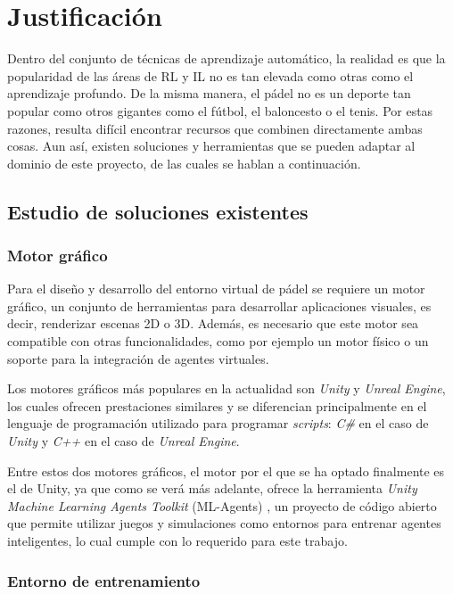 \chapter{Justificación}\label{chapter:justificacion}

Dentro del conjunto de técnicas de aprendizaje automático, la realidad es que la popularidad de las áreas de RL y IL no es tan elevada como otras como el aprendizaje profundo. De la misma manera, el pádel no es un deporte tan popular como otros gigantes como el fútbol, el baloncesto o el tenis. Por estas razones, resulta difícil encontrar recursos que combinen directamente ambas cosas. Aun así, existen soluciones y herramientas que se pueden adaptar al dominio de este proyecto, de las cuales se hablan a continuación.

\section{Estudio de soluciones existentes}

\subsection{Motor gráfico}

Para el diseño y desarrollo del entorno virtual de pádel se requiere un motor gráfico, un conjunto de herramientas para desarrollar aplicaciones visuales, es decir, renderizar escenas 2D o 3D. Además, es necesario que este motor sea compatible con otras funcionalidades, como por ejemplo un motor físico o un soporte para la integración de agentes virtuales.

Los motores gráficos más populares en la actualidad son \emph{Unity} y \emph{Unreal Engine}, los cuales ofrecen prestaciones similares y se diferencian principalmente en el lenguaje de programación utilizado para programar \emph{scripts}: \emph{C\#} en el caso de \emph{Unity} y \emph{C++} en el caso de \emph{Unreal Engine}.

Entre estos dos motores gráficos, el motor por el que se ha optado finalmente es el de Unity, ya que como se verá más adelante, ofrece la herramienta \emph{Unity Machine Learning Agents Toolkit} (ML-Agents) \parencite{ml-agents-github}, un proyecto de código abierto que permite utilizar juegos y simulaciones como entornos para entrenar agentes inteligentes, lo cual cumple con lo requerido para este trabajo. 

\subsection{Entorno de entrenamiento}

